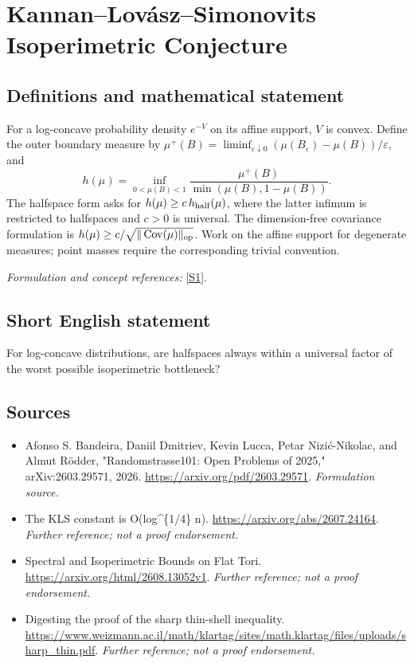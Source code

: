 \documentclass[11pt]{article}
\begin{document}
\section*{\texorpdfstring{Kannan–Lovász–Simonovits Isoperimetric Conjecture}{Kannan–Lovász–Simonovits Isoperimetric Conjecture}}\label{30004948}
\subsection{Definitions and mathematical statement}
For a log-concave probability density $e^{-V}$ on its affine support, $V$ is convex. Define the outer boundary measure by $\mu^+(B)=\liminf_{\varepsilon\downarrow0}(\mu(B_\varepsilon)-\mu(B))/\varepsilon$, and
\[
 h(\mu)=\inf_{0<\mu(B)<1}\frac{\mu^+(B)}{\min(\mu(B),1-\mu(B))}.
\]
The halfspace form asks for $h(\mu)\ge c\,h_{\rm half}(\mu)$, where the latter infimum is restricted to halfspaces and $c>0$ is universal. The dimension-free covariance formulation is $h(\mu)\ge c/\sqrt{\|\operatorname{Cov}(\mu)\|_{\rm op}}$. Work on the affine support for degenerate measures; point masses require the corresponding trivial convention.
\par\smallskip\textit{Formulation and concept references:} \href{https://arxiv.org/pdf/2603.29571}{[S1]}.

\subsection{Short English statement}
For log-concave distributions, are halfspaces always within a universal factor of the worst possible isoperimetric bottleneck?
\subsection{Sources}
\begin{itemize}
\item[S1]Afonso S. Bandeira, Daniil Dmitriev, Kevin Lucca, Petar Nizić-Nikolac, and Almut Rödder, "Randomstrasse101: Open Problems of 2025," arXiv:2603.29571, 2026.
\url{https://arxiv.org/pdf/2603.29571}.
\textit{Formulation source.}
\item[S2]The KLS constant is O(log\textasciicircum{}\{1/4\} n).
\url{https://arxiv.org/abs/2607.24164}.
\textit{Further reference; not a proof endorsement.}
\item[S3]Spectral and Isoperimetric Bounds on Flat Tori.
\url{https://arxiv.org/html/2608.13052v1}.
\textit{Further reference; not a proof endorsement.}
\item[S4]Digesting the proof of the sharp thin-shell inequality.
\url{https://www.weizmann.ac.il/math/klartag/sites/math.klartag/files/uploads/sharp_thin.pdf}.
\textit{Further reference; not a proof endorsement.}
\end{itemize}
\end{document}
